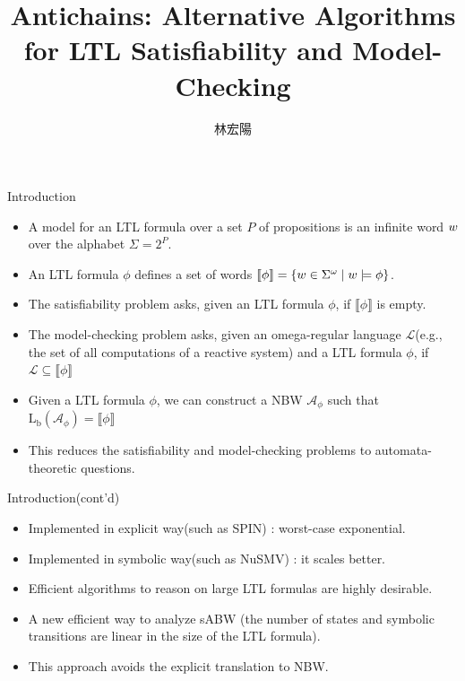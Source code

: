\documentclass[12pt]{beamer}
\title{Antichains: Alternative Algorithms for LTL Satisfiability and Model-Checking}
\author{林宏陽}
\begin{document}
\begin{frame}
	\maketitle
\end{frame}

\begin{frame}{Introduction}
	\begin{itemize}
		\item A model for an LTL formula over a set $P$ of propositions is an infinite word $\mathnormal{w}$ over the alphabet $\Sigma = 2^{P}$.
		\item An LTL formula $\phi$ defines a set of words $\llbracket \phi \rrbracket = \{\mathnormal{w} \in \Sigma^{\omega} \mid \mathnormal{w} \models \phi\}$.
		\item The satisfiability problem asks, given an LTL formula $\phi$, if $\llbracket \phi \rrbracket$ is empty.
		\item The model-checking problem asks, given an omega-regular language $\mathcal{L}$(e.g., the set
of all computations of a reactive system) and a LTL formula $\phi$, if $\mathcal{L} \subseteq \llbracket \phi \rrbracket$
		\item Given a LTL formula $\phi$, we can construct a NBW $\mathcal{A}_{\phi}$ such that $\text{L}_{\text{b}}(\mathcal{A}_{\phi}) = \llbracket \phi \rrbracket$
		\item This reduces the satisfiability and model-checking problems to automata-theoretic questions.
	\end{itemize}
\end{frame}

\begin{frame}{Introduction(cont'd)}
	\begin{itemize}
		\item Implemented in explicit way(such as SPIN) : worst-case exponential.
		\item Implemented in symbolic way(such as NuSMV) : it scales better.
		\item Efficient algorithms to reason on large LTL formulas are highly desirable.
		\item A new efficient way to analyze sABW (the number of states and symbolic transitions are linear in the size of the LTL formula).
		\item This approach avoids the explicit translation to NBW.
	\end{itemize}
\end{frame}
\end{document}
